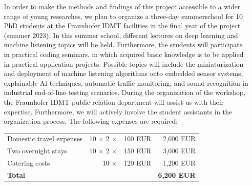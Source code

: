 \documentclass[11pt]{article}
\begin{document}
In order to make the methods and findings of this project accessible to a wider range of young researches, we plan to organize a three-day summerschool for 10 PhD students at the Fraunhofer IDMT facilities in the final year of the project (summer 2023).
In this summer school, different lectures on deep learning and machine listening topics will be held. Furthermore, the students will participate in practical coding seminars, in which acquired basic knowledge is to be applied in practical application projects. Possible topics will include the miniaturization and deployment of machine listening algorithms onto embedded sensor systems, explainable AI techniques, automatic traffic monitoring, and sound recognition in industrial end-of-line testing scenarios.
During the organization of the workshop, the Fraunhofer IDMT public relation department will assist us with their expertise.
Furthermore, we will actively involve the student assistants in the organization process.
The following expenses are required:

\begin{table}[h!]
\centering
\begin{tabular}{lrrr}
  Domestic travel expenses  & 10 $\times$ 2  $\times$ & 100 EUR & 2,000 EUR  \\
 Two overnight stays & 10 $\times$ 2  $\times$ & 150 EUR & 3,000 EUR  \\
 Catering costs & 10  $\times$ & 120 EUR & 1,200 EUR  \\
 \hline
 \textbf{Total} &  &  &  \textbf{6,200 EUR}  \\
\end{tabular}
\end{table}
\end{document}
